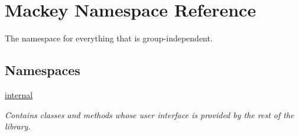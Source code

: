 \hypertarget{namespaceMackey}{}\section{Mackey Namespace Reference}
\label{namespaceMackey}


The namespace for everything that is group-\/independent.  


\subsection*{Namespaces}
\begin{DoxyCompactItemize}
\item 
 \hyperlink{namespaceMackey_1_1internal}{internal}
\begin{DoxyCompactList}\small\item\em Contains classes and methods whose user interface is provided by the rest of the library. \end{DoxyCompactList}\end{DoxyCompactItemize}
